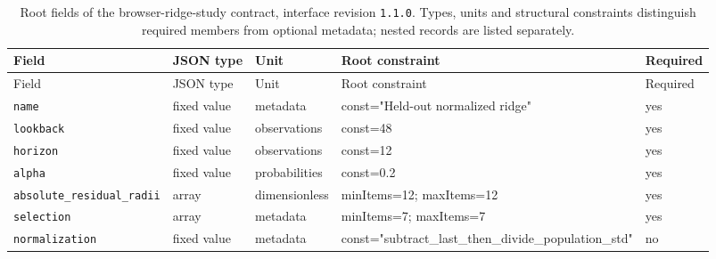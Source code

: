 \begingroup\small
\begin{longtable}{@{}p{}p{}p{}p{}p{}@{}}
\caption{Root fields of the browser-ridge-study contract, interface revision \texttt{1.1.0}. Types, units and structural constraints distinguish required members from optional metadata; nested records are listed separately.}\label{tab:contract-browser-ridge-study}\\
\toprule Field & JSON type & Unit & Root constraint & Required\\\midrule\endfirsthead
\toprule Field & JSON type & Unit & Root constraint & Required\\\midrule\endhead
\texttt{name} & fixed value & metadata & const="Held-out normalized ridge" & yes\\
\texttt{lookback} & fixed value & observations & const=48 & yes\\
\texttt{horizon} & fixed value & observations & const=12 & yes\\
\texttt{alpha} & fixed value & probabilities & const=0.2 & yes\\
\texttt{absolute\_\allowbreak{}residual\_\allowbreak{}radii} & array & dimensionless & minItems=12; maxItems=12 & yes\\
\texttt{selection} & array & metadata & minItems=7; maxItems=7 & yes\\
\texttt{normalization} & fixed value & metadata & const="subtract\_\allowbreak{}last\_\allowbreak{}then\_\allowbreak{}divide\_\allowbreak{}population\_\allowbreak{}std" & no\\
\bottomrule
\end{longtable}
\endgroup

